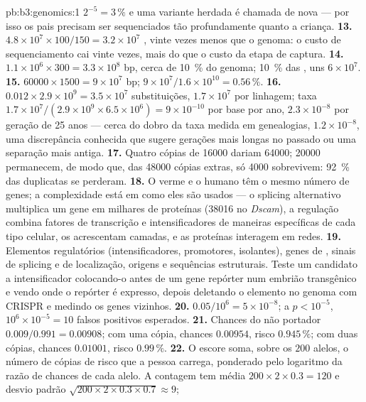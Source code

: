 \begin{solution}{pb:b3:genomics:1}
$2^{-5} = 3\,\%$ e uma variante herdada é chamada de nova --- por isso
os pais precisam ser sequenciados tão profundamente quanto a criança.
\textbf{13.} $4.8\times 10^{7}\times 100/150 = 3.2\times 10^{7}$
, vinte vezes menos que o genoma: o custo de sequenciamento cai
vinte vezes, mais do que o custo da etapa de captura.
\textbf{14.} $1.1\times 10^{6}\times 300 = 3.3\times 10^{8}$ bp, cerca
de \qty{10}{\%} do genoma; \qty{10}{\%} das , uns $6\times
10^{7}$.
\textbf{15.} $\num{60000}\times 1500 = 9\times 10^{7}$ bp; $9\times
10^{7}/1.6\times 10^{10} = 0.56\,\%$.
\textbf{16.} $0.012\times 2.9\times 10^{9} = 3.5\times 10^{7}$
substituições, $1.7\times 10^{7}$ por linhagem; taxa $1.7\times
10^{7}/(2.9\times 10^{9}\times 6.5\times 10^{6}) = 9\times 10^{-10}$
por base por ano, $2.3\times 10^{-8}$ por geração de 25 anos --- cerca
do dobro da taxa medida em genealogias, $1.2\times 10^{-8}$, uma
discrepância conhecida que sugere gerações mais longas no passado ou
uma separação mais antiga.
\textbf{17.} Quatro cópias de \num{16000} dariam \num{64000};
\num{20000} permanecem, de modo que, das \num{48000} cópias extras, só
\num{4000} sobrevivem: \qty{92}{\%} das duplicatas se perderam.
\textbf{18.} O verme e o humano têm o mesmo número de genes; a
complexidade está em como eles são usados --- o splicing alternativo
multiplica um gene em milhares de proteínas (\num{38016} no
\emph{Dscam}), a regulação combina fatores de transcrição e
intensificadores de maneiras específicas de cada tipo celular, os  acrescentam camadas, e as proteínas interagem em
redes.
\textbf{19.} Elementos regulatórios (intensificadores, promotores,
isolantes), genes de , sinais de splicing e de
localização, origens e sequências estruturais. Teste um candidato a
intensificador colocando-o antes de um gene repórter num embrião
transgênico e vendo onde o repórter é expresso, depois deletando o
elemento no genoma com CRISPR e medindo os genes vizinhos.
\textbf{20.} $0.05/10^{6} = 5\times 10^{-8}$; a $p < 10^{-5}$,
$10^{6}
\times 10^{-5} = 10$ falsos positivos esperados.
\textbf{21.} Chances do não portador $0.009/0.991 = 0.00908$; com uma
cópia, chances $0.00954$, risco $0.945\,\%$; com duas cópias, chances
$0.01001$, risco $0.99\,\%$.
\textbf{22.} O escore soma, sobre os $200$ alelos, o número de cópias de
risco que a pessoa carrega, ponderado pelo logaritmo da razão de
chances de cada alelo. A contagem tem média $200\times 2\times 0.3 = 120$ e desvio padrão $\sqrt{200\times 2\times 0.3\times 0.7} \approx 9$;

\end{solution}
